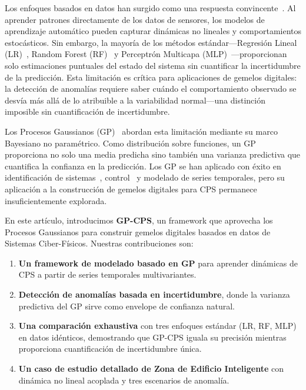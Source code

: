 \documentclass[conference]{IEEEtran}
\begin{document}
Los enfoques basados en datos han surgido como una respuesta convincente~\cite{yuan2019}. Al aprender patrones directamente de los datos de sensores, los modelos de aprendizaje automático pueden capturar dinámicas no lineales y comportamientos estocásticos. Sin embargo, la mayoría de los métodos estándar---Regresión Lineal (LR)~\cite{ljung1999}, Random Forest (RF)~\cite{breiman2001} y Perceptrón Multicapa (MLP)~\cite{hornik1989}---proporcionan solo estimaciones puntuales del estado del sistema sin cuantificar la incertidumbre de la predicción. Esta limitación es crítica para aplicaciones de gemelos digitales: la detección de anomalías requiere saber cuándo el comportamiento observado se desvía más allá de lo atribuible a la variabilidad normal---una distinción imposible sin cuantificación de incertidumbre.

Los Procesos Gaussianos (GP)~\cite{rasmussen2006} abordan esta limitación mediante su marco Bayesiano no paramétrico. Como distribución sobre funciones, un GP proporciona no solo una media predicha sino también una varianza predictiva que cuantifica la confianza en la predicción. Los GP se han aplicado con éxito en identificación de sistemas~\cite{kocijan2004}, control~\cite{deisenroth2015} y modelado de series temporales, pero su aplicación a la construcción de gemelos digitales para CPS permanece insuficientemente explorada.

En este artículo, introducimos \textbf{GP-CPS}, un framework que aprovecha los Procesos Gaussianos para construir gemelos digitales basados en datos de Sistemas Ciber-Físicos. Nuestras contribuciones son:

\begin{enumerate}
\item \textbf{Un framework de modelado basado en GP} para aprender dinámicas de CPS a partir de series temporales multivariantes.
\item \textbf{Detección de anomalías basada en incertidumbre}, donde la varianza predictiva del GP sirve como envelope de confianza natural.
\item \textbf{Una comparación exhaustiva} con tres enfoques estándar (LR, RF, MLP) en datos idénticos, demostrando que GP-CPS iguala su precisión mientras proporciona cuantificación de incertidumbre única.
\item \textbf{Un caso de estudio detallado de Zona de Edificio Inteligente} con dinámica no lineal acoplada y tres escenarios de anomalía.
\end{enumerate}
\end{document}
